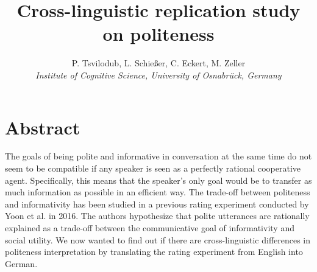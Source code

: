 \documentclass[a4paper,11pt]{article}
\title{Cross-linguistic replication study on politeness}
\author{P. Tsvilodub, L. Schießer, C. Eckert, M. Zeller 
\\ \textit{Institute of Cognitive Science, University of Osnabrück, Germany}}
\begin{document}
\maketitle

\section{Abstract}
The goals of being polite and informative in conversation at the same time do not seem to be compatible if any speaker is seen as a perfectly  rational cooperative agent. Specifically, this means that the speaker's only goal would be to transfer as much information as possible in an efficient way. The trade-off between politeness and informativity has been studied in a previous rating experiment conducted by Yoon et al. \cite{yoon2016talking} in 2016. The authors hypothesize that polite utterances are rationally explained as a trade-off between the communicative goal of informativity and social utility. We now wanted to find out if there are cross-linguistic differences in politeness interpretation by translating the rating experiment from English into German. 
\end{document}
